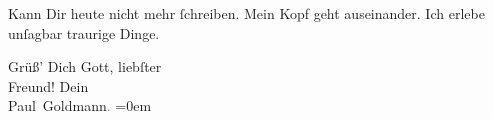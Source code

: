 \pstart
           Kann Dir heute nicht mehr{ }ſchreiben. Mein Kopf geht auseinander. Ich erlebe unſagbar
               traurige Dinge.\pend
           
\pstart
           Grüß’ Dich Gott, liebſter {\\[\baselineskip]}Freund! Dein {\\[\baselineskip]}\spacefill\mbox{Paul Goldmann\textcolor{gray}{.}}\pend
           \leftskip=0em{}
\pstart
           \noindent{}\label{T_L02759-1v}\label{T_L02759-1}\pend
           \endnumbering{}  \newcommand{\dateiname}{L02759}\newcommand{\titel}{Paul Goldmann an Arthur Schnitzler, 16. 12. [1895]}\newcommand{\editorInnen}{Martin Anton Müller und Laura Untner}
